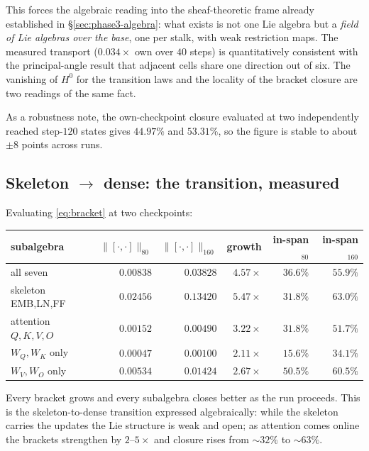 This forces the algebraic reading into the sheaf-theoretic frame already
established in \S\ref{sec:phase3-algebra}: what exists is not one Lie algebra
but a \emph{field of Lie algebras over the base}, one per stalk, with weak
restriction maps. The measured transport ($0.034\times$ own over $40$ steps)
is quantitatively consistent with the principal-angle result that adjacent
cells share one direction out of six. The vanishing of $H^0$ for the transition
laws and the locality of the bracket closure are two readings of the same fact.

As a robustness note, the own-checkpoint closure evaluated at two independently
reached step-$120$ states gives $44.97\%$ and $53.31\%$, so the figure is
stable to about $\pm 8$ points across runs.

\subsection{Skeleton \texorpdfstring{$\to$}{->} dense: the transition, measured}

Evaluating \eqref{eq:bracket} at two checkpoints:

\begin{center}
\begin{tabular}{lrrrrr}
\toprule
subalgebra & $\|[\cdot,\cdot]\|_{80}$ & $\|[\cdot,\cdot]\|_{160}$ & growth
& in-span$_{80}$ & in-span$_{160}$ \\
\midrule
all seven                 & $0.00838$ & $0.03828$ & $4.57\times$ & $36.6\%$ & $55.9\%$ \\
skeleton EMB,LN,FF        & $0.02456$ & $0.13420$ & $5.47\times$ & $31.8\%$ & $63.0\%$ \\
attention $Q,K,V,O$       & $0.00152$ & $0.00490$ & $3.22\times$ & $31.8\%$ & $51.7\%$ \\
$W_Q,W_K$ only            & $0.00047$ & $0.00100$ & $2.11\times$ & $15.6\%$ & $34.1\%$ \\
$W_V,W_O$ only            & $0.00534$ & $0.01424$ & $2.67\times$ & $50.5\%$ & $60.5\%$ \\
\bottomrule
\end{tabular}
\end{center}

Every bracket grows and every subalgebra closes better as the run proceeds.
This is the skeleton-to-dense transition expressed algebraically: while the
skeleton carries the updates the Lie structure is weak and open; as attention
comes online the brackets strengthen by $2$--$5\times$ and closure rises from
$\sim\!32\%$ to $\sim\!63\%$.

